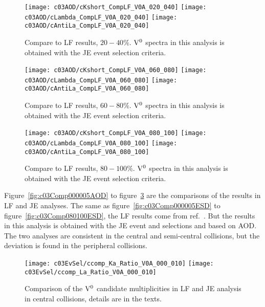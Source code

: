 \begin{figure}[htb]
\begin{center}
\texttt{[image: c03AOD/cKshort\_CompLF\_V0A\_020\_040]}
\texttt{[image: c03AOD/cLambda\_CompLF\_V0A\_020\_040]}
\texttt{[image: c03AOD/cAntiLa\_CompLF\_V0A\_020\_040]}
\caption{Compare to LF results, $20-40\%$.
         ${\rm V}^{0}$ spectra in this analysis is obtained with the
         JE event selection criteria.}
\label{fig:c03Comp020040AOD}
\end{center}
\end{figure}

\begin{figure}[htb]
\begin{center}
\texttt{[image: c03AOD/cKshort\_CompLF\_V0A\_060\_080]}
\texttt{[image: c03AOD/cLambda\_CompLF\_V0A\_060\_080]}
\texttt{[image: c03AOD/cAntiLa\_CompLF\_V0A\_060\_080]}
\caption{Compare to LF results, $60-80\%$.
         ${\rm V}^{0}$ spectra in this analysis is obtained with the
         JE event selection criteria.}
\label{fig:c03Comp060080AOD}
\end{center}
\end{figure}

\begin{figure}[htb]
\begin{center}
\texttt{[image: c03AOD/cKshort\_CompLF\_V0A\_080\_100]}
\texttt{[image: c03AOD/cLambda\_CompLF\_V0A\_080\_100]}
\texttt{[image: c03AOD/cAntiLa\_CompLF\_V0A\_080\_100]}
\caption{Compare to LF results, $80-100\%$.
         ${\rm V}^{0}$ spectra in this analysis is obtained with the
         JE event selection criteria.}
\label{fig:c03Comp080100AOD}
\end{center}
\end{figure}

Figure~\ref{fig:c03Comp000005AOD} to figure~\ref{fig:c03Comp080100AOD}
are the comparisons of the results in LF and JE analyses.
The same as figure~\ref{fig:c03Comp000005ESD} to
figure~\ref{fig:c03Comp080100ESD},
the LF results come from ref.~\cite{Abelev:2013haa}.
But the results in this analysis is obtained with the JE event and selections
and based on AOD.
The two analyses are consistent in the central and semi-central collisions,
but the deviation is found in the peripheral collisions.

\begin{figure}[!htb]
\begin{center}
\texttt{[image: c03EvSel/ccomp\_Ka\_Ratio\_V0A\_000\_010]}
\texttt{[image: c03EvSel/ccomp\_La\_Ratio\_V0A\_000\_010]}
\caption{Comparison of the ${\rm V}^{0}$ candidate multiplicities
         in LF and JE analysis in central collisions,
         details are in the texts.}
\label{fig:c03CompMultiV0s000010}
\end{center}
\end{figure}

